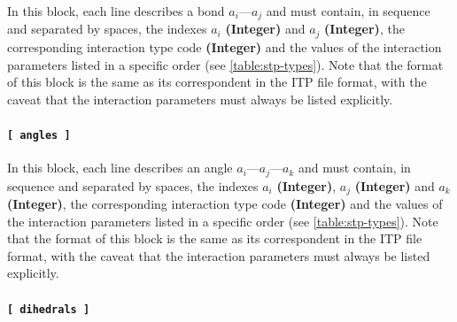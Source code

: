 \documentclass[10pt,a4paper,openany]{memoir}
\numberwithin{equation}{section}
\begin{document}
In this block, each line describes a bond $a_i$---$a_j$ and must
contain, in sequence and separated by spaces, the indexes $a_i$
\textbf{(Integer)} and $a_j$ \textbf{(Integer)}, the corresponding
interaction type code \textbf{(Integer)} and the values of the
interaction parameters listed in a specific order (see
\autoref{table:stp-types}). Note that the format of this block is the
same as its correspondent in the ITP file format, with the caveat that
the interaction parameters must always be listed explicitly.

\paragraph{\texttt{[~angles~]}}

In this block, each line describes an angle $a_i$---$a_j$---$a_k$ and
must contain, in sequence and separated by spaces, the indexes $a_i$
\textbf{(Integer)}, $a_j$ \textbf{(Integer)} and $a_k$
\textbf{(Integer)}, the corresponding interaction type code
\textbf{(Integer)} and the values of the interaction parameters listed
in a specific order (see \autoref{table:stp-types}). Note that the
format of this block is the same as its correspondent in the ITP file
format, with the caveat that the interaction parameters must always be
listed explicitly.

\paragraph{\texttt{[~dihedrals~]}}
\end{document}
